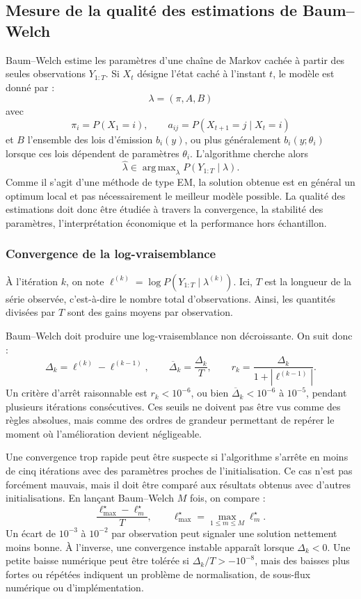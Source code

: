 \documentclass[11pt]{article}
\begin{document}
\subsection{Mesure de la qualité des estimations de Baum--Welch}

Baum--Welch estime les paramètres d'une chaîne de Markov cachée à partir des seules observations \(Y_{1:T}\). Si \(X_t\) désigne l'état caché à l'instant \(t\), le modèle est donné par :
\[
\lambda=(\pi,A,B)
\]
avec
\[
\pi_i=P(X_1=i),\qquad
a_{ij}=P(X_{t+1}=j\mid X_t=i)
\]
et \(B\) l'ensemble des lois d'émission \(b_i(y)\), ou plus généralement \(b_i(y;\theta_i)\) lorsque ces lois dépendent de paramètres \(\theta_i\). L'algorithme cherche alors
\[
\widehat{\lambda}\in\mathop{\mathrm{arg\,max}}_{\lambda}P(Y_{1:T}\mid \lambda).
\]
Comme il s'agit d'une méthode de type EM, la solution obtenue est en général un optimum local et pas nécessairement le meilleur modèle possible. La qualité des estimations doit donc être étudiée à travers la convergence, la stabilité des paramètres, l'interprétation économique et la performance hors échantillon.

\subsubsection{Convergence de la log-vraisemblance}

À l'itération \(k\), on note \(\ell^{(k)}=\log P(Y_{1:T}\mid \lambda^{(k)})\). Ici, \(T\) est la longueur de la série observée, c'est-à-dire le nombre total d'observations. Ainsi, les quantités divisées par \(T\) sont des gains moyens par observation.

Baum--Welch doit produire une log-vraisemblance non décroissante. On suit donc :
\[
\Delta_k=\ell^{(k)}-\ell^{(k-1)},\qquad
\overline{\Delta}_k=\frac{\Delta_k}{T},\qquad
r_k=\frac{\Delta_k}{1+|\ell^{(k-1)}|}.
\]
Un critère d'arrêt raisonnable est \(r_k<10^{-6}\), ou bien \(\overline{\Delta}_k<10^{-6}\) à \(10^{-5}\), pendant plusieurs itérations consécutives. Ces seuils ne doivent pas être vus comme des règles absolues, mais comme des ordres de grandeur permettant de repérer le moment où l'amélioration devient négligeable.

Une convergence trop rapide peut être suspecte si l'algorithme s'arrête en moins de cinq itérations avec des paramètres proches de l'initialisation. Ce cas n'est pas forcément mauvais, mais il doit être comparé aux résultats obtenus avec d'autres initialisations. En lançant Baum--Welch \(M\) fois, on compare :
\[
\frac{\ell_{\max}^\star-\ell_m^\star}{T},
\qquad
\ell_{\max}^\star=\max_{1\leq m\leq M}\ell_m^\star.
\]
Un écart de \(10^{-3}\) à \(10^{-2}\) par observation peut signaler une solution nettement moins bonne. À l'inverse, une convergence instable apparaît lorsque \(\Delta_k<0\). Une petite baisse numérique peut être tolérée si \(\Delta_k/T>-10^{-8}\), mais des baisses plus fortes ou répétées indiquent un problème de normalisation, de sous-flux numérique ou d'implémentation.
\end{document}

